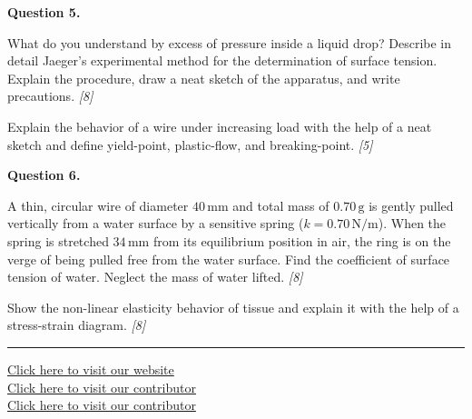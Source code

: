 \documentclass[11pt,a4paper]{article}
\newcommand{\pts}[1]{\hfill   \textit{[#1]}}
\begin{document}
\medskip


\noindent   \textbf{Question 5.}

\begin{parts}
  \item What do you understand by excess of pressure inside a liquid drop? Describe in detail Jaeger's experimental method for the determination of surface tension. Explain the procedure, draw a neat sketch of the apparatus, and write precautions. \pts{8}
  \item Explain the behavior of a wire under increasing load with the help of a neat sketch and define yield-point, plastic-flow, and breaking-point. \pts{5}
\end{parts}

\medskip


\noindent   \textbf{Question 6.}

\begin{parts}
  \item A thin, circular wire of diameter $40\, \text{mm}$ and total mass of $0.70\, \text{g}$ is gently pulled vertically from a water surface by a sensitive spring ($k = 0.70\, \text{N/m}$). When the spring is stretched $34\, \text{mm}$ from its equilibrium position in air, the ring is on the verge of being pulled free from the water surface. Find the coefficient of surface tension of water. Neglect the mass of water lifted. \pts{8}
  \item Show the non-linear elasticity behavior of tissue and explain it with the help of a stress-strain diagram. \pts{8}
\end{parts}

\vfill
\rule{\linewidth}{0.4pt}

\begin{center}\small
  \href{https://bhu-exam.vercel.app/}{Click here to visit our website}\\[4pt]\href{https://me-aryan.vercel.app/}{Click here to visit our contributor}\\[4pt]\href{https://quashan-me.vercel.app/}{Click here to visit our contributor}
\end{center}
\end{document}
